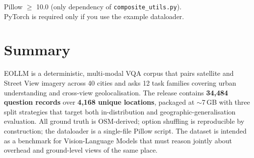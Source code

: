 \documentclass[11pt,a4paper]{article}
\begin{document}
\begin{infobox}
Pillow $\geq$ 10.0 (only dependency of \texttt{composite\_utils.py}).\\
PyTorch is required only if you use the example dataloader.
\end{infobox}

\section{Summary}

EOLLM is a deterministic, multi-modal VQA corpus that pairs satellite
and Street View imagery across 40 cities and asks 12 task families
covering urban understanding and cross-view geolocalisation. The
release contains \textbf{34{,}484 question records} over \textbf{4{,}168
unique locations}, packaged at $\sim$7\,GB with three split strategies
that target both in-distribution and geographic-generalisation
evaluation. All ground truth is OSM-derived; option shuffling is
reproducible by construction; the dataloader is a single-file Pillow
script. The dataset is intended as a benchmark for Vision-Language
Models that must reason jointly about overhead and ground-level views
of the same place.
\end{document}
